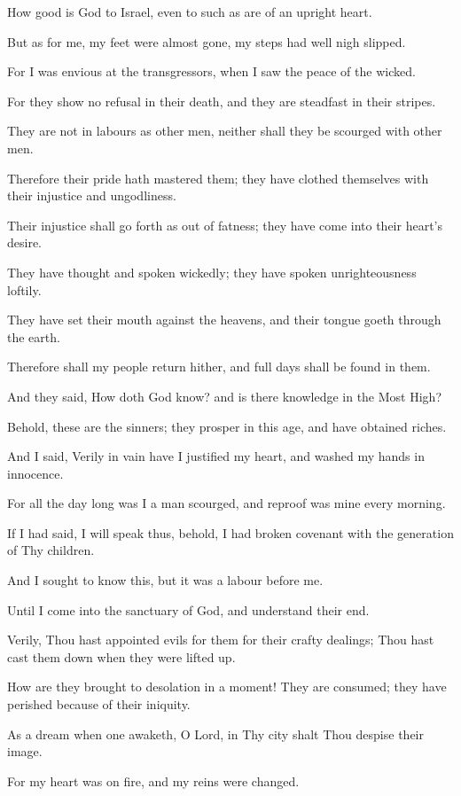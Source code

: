 How good is God to Israel, even to such as are of an upright heart.

But as for me, my feet were almost gone, my steps had well nigh slipped.

For I was envious at the transgressors, when I saw the peace of the wicked.

For they show no refusal in their death, and they are steadfast in their stripes.

They are not in labours as other men, neither shall they be scourged with other men.

Therefore their pride hath mastered them; they have clothed themselves with their injustice and ungodliness.

Their injustice shall go forth as out of fatness; they have come into their heart’s desire.

They have thought and spoken wickedly; they have spoken unrighteousness loftily.

They have set their mouth against the heavens, and their tongue goeth through the earth.

Therefore shall my people return hither, and full days shall be found in them.

And they said, How doth God know? and is there knowledge in the Most High?

Behold, these are the sinners; they prosper in this age, and have obtained riches.

And I said, Verily in vain have I justified my heart, and washed my hands in innocence.

For all the day long was I a man scourged, and reproof was mine every morning.

If I had said, I will speak thus, behold, I had broken covenant with the generation of Thy children.

And I sought to know this, but it was a labour before me.

Until I come into the sanctuary of God, and understand their end.

Verily, Thou hast appointed evils for them for their crafty dealings; Thou hast cast them down when they were lifted up.

How are they brought to desolation in a moment! They are consumed; they have perished because of their iniquity.

As a dream when one awaketh, O Lord, in Thy city shalt Thou despise their image.

For my heart was on fire, and my reins were changed.

